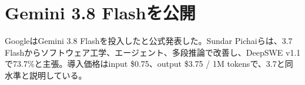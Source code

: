 \section{Gemini 3.8 Flashを公開}
GoogleはGemini 3.8 Flashを投入したと公式発表した。Sundar Pichaiらは、3.7 Flashからソフトウェア工学、エージェント、多段推論で改善し、DeepSWE v1.1で73.7\%と主張。導入価格はinput \$0.75、output \$3.75 / 1M tokensで、3.7と同水準と説明している。
